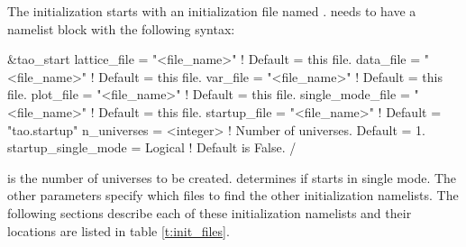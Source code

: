 The initialization starts with an initialization file named
.   needs to have a  namelist
block with the following syntax:
\begin{example}
  &tao_start
    lattice_file      = "<file_name>"  ! Default = this file.
    data_file         = "<file_name>"  ! Default = this file.
    var_file          = "<file_name>"  ! Default = this file.
    plot_file         = "<file_name>"  ! Default = this file.
    single_mode_file  = "<file_name>"  ! Default = this file.
    startup_file      = "<file_name>"  ! Default = "tao.startup"
    n_universes       = <integer>            ! Number of universes. Default = 1.
    startup_single_mode = Logical            ! Default is False.
  /
\end{example}
 is the number of universes to be created.
 determines if  starts in single
mode. The other parameters specify which files to find the other
initialization namelists. The following sections describe each of
these initialization namelists and their locations are listed in table
\ref{t:init_files}.

